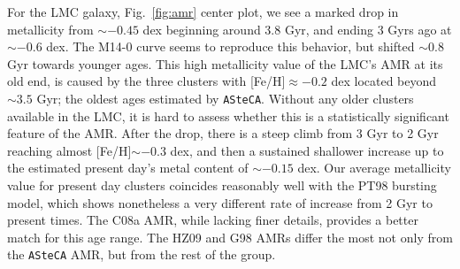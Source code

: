 \documentclass[draft]{aa}
\begin{document}
For the LMC galaxy, Fig.~\ref{fig:amr} center plot, we see a marked
drop in metallicity from ${\sim-}0.45$ dex beginning around 3.8 Gyr, and
ending 3 Gyrs ago at ${\sim-}0.6$ dex. The M14-0 curve seems to reproduce this
behavior, but shifted ${\sim}0.8$ Gyr towards younger ages.
%
This high metallicity value of the LMC's AMR at its old end, is
caused by the three clusters with [Fe/H]${\approx-0.2}$ dex located beyond
${\sim}3.5$ Gyr; the oldest ages estimated by \texttt{ASteCA}. Without any older
clusters available in the LMC, it is hard to assess whether this is a
statistically significant feature of the AMR.
%
%
After the drop, there is a steep climb from 3 Gyr to 2 Gyr reaching almost 
[Fe/H]${\sim-}0.3$ dex, and then a sustained shallower increase up
to the estimated present day's metal content of ${\sim-}0.15$ dex.
%
Our average metallicity value for present day clusters coincides reasonably
well with the PT98 bursting model, which shows nonetheless a very different
rate of increase from 2 Gyr to present times. The C08a AMR, while lacking finer
details, provides a better match for this age range.
The HZ09 and G98 AMRs differ the most not only from the \texttt{ASteCA}
AMR, but from the rest of the group.
\end{document}
